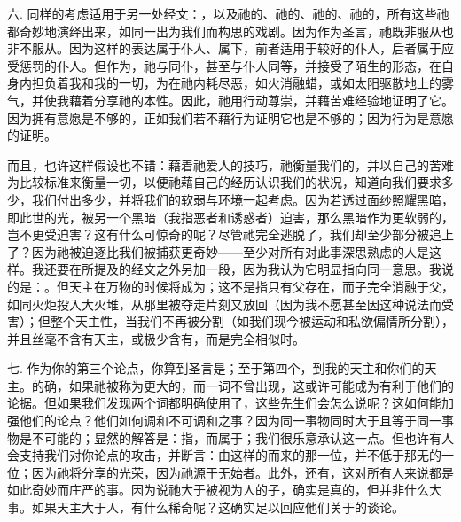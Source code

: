 六. 同样的考虑适用于另一处经文：，以及祂的、祂的、祂的、祂的，所有这些祂都奇妙地演绎出来，如同一出为我们而构思的戏剧。因为作为圣言，祂既非服从也非不服从。因为这样的表达属于仆人、属下，前者适用于较好的仆人，后者属于应受惩罚的仆人。但作为，祂与同仆，甚至与仆人同等，并接受了陌生的形态，在自身内担负着我和我的一切，为在祂内耗尽恶，如火消融蜡，或如太阳驱散地上的雾气，并使我藉着分享祂的本性。因此，祂用行动尊崇，并藉苦难经验地证明了它。因为拥有意愿是不够的，正如我们若不藉行为证明它也是不够的；因为行为是意愿的证明。\par

而且，也许这样假设也不错：藉着祂爱人的技巧，祂衡量我们的，并以自己的苦难为比较标准来衡量一切，以便祂藉自己的经历认识我们的状况，知道向我们要求多少，我们付出多少，并将我们的软弱与环境一起考虑。因为若透过面纱照耀黑暗，即此世的光，被另一个黑暗（我指恶者和诱惑者）迫害，那么黑暗作为更软弱的，岂不更受迫害？这有什么可惊奇的呢？尽管祂完全逃脱了，我们却至少部分被追上了？因为祂被迫逐比我们被捕获更奇妙——至少对所有对此事深思熟虑的人是这样。我还要在所提及的经文之外另加一段，因为我认为它明显指向同一意思。我说的是：。但天主在万物的时候将成为；这不是指只有父存在，而子完全消融于父，如同火炬投入大火堆，从那里被夺走片刻又放回（因为我不愿甚至因这种说法而受害）；但整个天主性，当我们不再被分割（如我们现今被运动和私欲偏情所分割），并且丝毫不含有天主，或极少含有，而是完全相似时。\par

七. 作为你的第三个论点，你算到圣言是；至于第四个，到我的天主和你们的天主。的确，如果祂被称为更大的，而一词不曾出现，这或许可能成为有利于他们的论据。但如果我们发现两个词都明确使用了，这些先生们会怎么说呢？这如何能加强他们的论点？他们如何调和不可调和之事？因为同一事物同时大于且等于同一事物是不可能的；显然的解答是：指，而属于；我们很乐意承认这一点。但也许有人会支持我们对你论点的攻击，并断言：由这样的而来的那一位，并不低于那无的一位；因为祂将分享的光荣，因为祂源于无始者。此外，还有，这对所有人来说都是如此奇妙而庄严的事。因为说祂大于被视为人的子，确实是真的，但并非什么大事。如果天主大于人，有什么稀奇呢？这确实足以回应他们关于的谈论。\par

